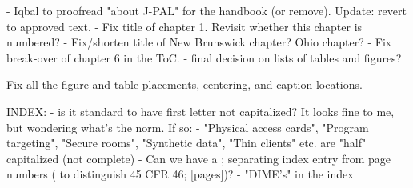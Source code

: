 - Iqbal to proofread "about J-PAL" for the handbook (or remove). Update: revert to approved text.
- Fix title of chapter 1. Revisit whether this chapter is numbered?
- Fix/shorten title of New Brunswick chapter? Ohio chapter?
- Fix break-over of chapter 6 in the ToC.
- final decision on lists of tables and figures?

Fix all the figure and table placements, centering, and caption locations.


INDEX:
- is it standard to have first letter not capitalized? It looks fine to me, but wondering what's the norm. If so:
- "Physical access cards", "Program targeting", "Secure rooms", "Synthetic data", "Thin clients" etc. are "half" capitalized (not complete)
- Can we have a ; separating index entry from page numbers ( to distinguish 45 CFR 46; [pages])?
- "DIME's" in the index

